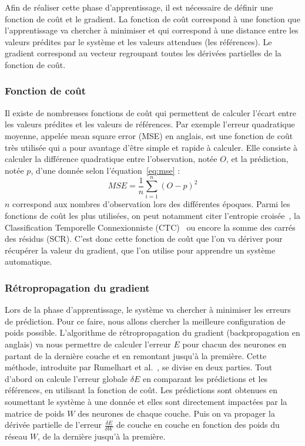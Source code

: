 Afin de réaliser cette phase d'apprentissage, il est nécessaire de définir une fonction de coût et le gradient. La fonction de coût correspond à une fonction que l'apprentissage va chercher à minimiser et qui correspond à une distance entre les valeurs prédites par le système et les valeurs attendues (les références). Le gradient correspond au vecteur regroupant toutes les dérivées partielles de la fonction de coût.

\subsubsection{Fonction de coût}
Il existe de nombreuses fonctions de coût qui permettent de calculer l'écart entre les valeurs prédites et les valeurs de références. %
Par exemple l'erreur quadratique moyenne, appelée mean square error (MSE) en anglais, est une fonction de coût très utilisée qui a pour avantage d'être simple et rapide à calculer. Elle consiste à calculer la différence quadratique entre l'observation, notée $O$, et la prédiction, notée $p$, d'une donnée selon l'équation~\ref{eq:mse} :
\begin{equation}
  MSE = \frac{1}{n}\sum_{i=1}^{n}(O-p)^2
  \label{eq:mse}
\end{equation}
$n$ correspond aux nombres d'observation lors des différentes époques. Parmi les fonctions de coût les plus utilisées, on peut notamment citer l'entropie croisée~\cite{Stemmer2002}, la Classification Temporelle Connexionniste (CTC)~\cite{Graves2006} ou encore la somme des carrés des résidus (SCR). C'est donc cette fonction de coût que l'on va dériver pour récupérer la valeur du gradient, que l'on utilise pour apprendre un système automatique.

\subsubsection{Rétropropagation du gradient}
Lors de la phase d'apprentissage, le système va chercher à minimiser les erreurs de prédiction. Pour ce faire, nous allons chercher la meilleure configuration de poids possible. L'algorithme de rétropropagation du gradient (backpropagation en anglais) va nous permettre de calculer l'erreur $E$ pour chacun des neurones en partant de la dernière couche et en remontant jusqu'à la première. Cette méthode, introduite par Rumelhart et al.~\cite{Rumelhart1986}, se divise en deux parties. Tout d'abord on calcule l'erreur globale $\delta E$ en comparant les prédictions et les références, en utilisant la fonction de coût. Les prédictions sont obtenues en soumettant le système à une donnée et elles sont directement impactées par la matrice de poids $W$ des neurones de chaque couche. Puis on va propager la dérivée partielle de l'erreur $\frac{\delta E}{\delta W}$ de couche en couche en fonction des poids du réseau $W$, de la dernière jusqu'à la première.

